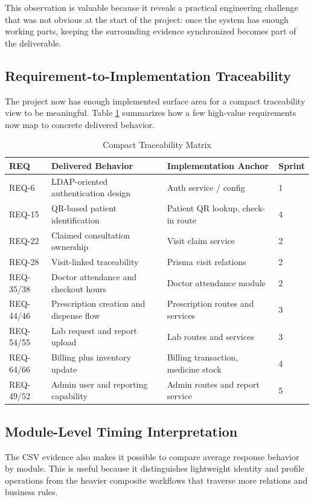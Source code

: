 \documentclass[conference]{IEEEtran}
\begin{document}
This observation is valuable because it reveals a practical engineering challenge that was not obvious at the start of the project: once the system has enough working parts, keeping the surrounding evidence synchronized becomes part of the deliverable.

\subsection{Requirement-to-Implementation Traceability}
The project now has enough implemented surface area for a compact traceability view to be meaningful. Table \ref{tab:traceability} summarizes how a few high-value requirements now map to concrete delivered behavior.

\begin{table}[!t]
\centering
\caption{Compact Traceability Matrix}
\begin{tabular}{|p{0.95cm}|p{3.1cm}|p{2.1cm}|p{1.0cm}|}
\hline
\textbf{REQ} & \textbf{Delivered Behavior} & \textbf{Implementation Anchor} & \textbf{Sprint} \\
\hline
REQ-6 & LDAP-oriented authentication design & Auth service / config & 1 \\
\hline
REQ-15 & QR-based patient identification & Patient QR lookup, check-in route & 4 \\
\hline
REQ-22 & Claimed consultation ownership & Visit claim service & 2 \\
\hline
REQ-28 & Visit-linked traceability & Prisma visit relations & 2 \\
\hline
REQ-35/38 & Doctor attendance and checkout hours & Doctor attendance module & 2 \\
\hline
REQ-44/46 & Prescription creation and dispense flow & Prescription routes and services & 3 \\
\hline
REQ-54/55 & Lab request and report upload & Lab routes and services & 3 \\
\hline
REQ-64/66 & Billing plus inventory update & Billing transaction, medicine stock & 4 \\
\hline
REQ-49/52 & Admin user and reporting capability & Admin routes and report service & 5 \\
\hline
\end{tabular}
\label{tab:traceability}
\end{table}

\subsection{Module-Level Timing Interpretation}
The CSV evidence also makes it possible to compare average response behavior by module. This is useful because it distinguishes lightweight identity and profile operations from the heavier composite workflows that traverse more relations and business rules.
\end{document}

